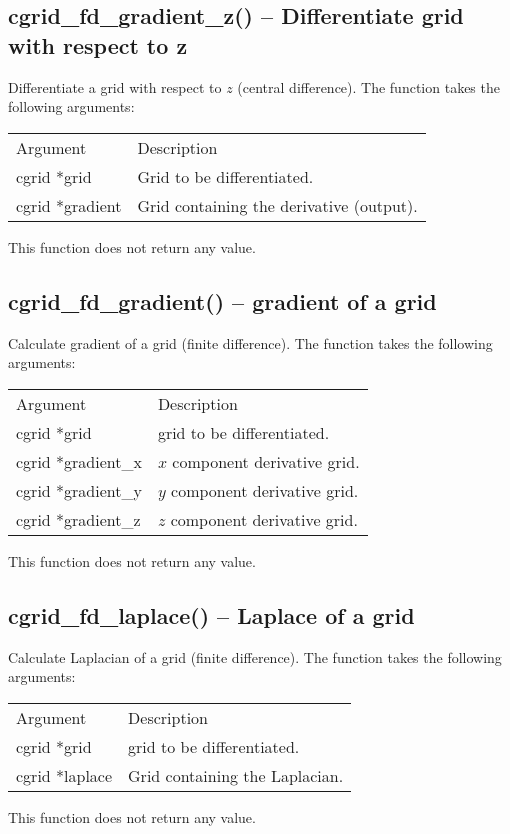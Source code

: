\documentclass[12pt,letterpaper]{report}
\begin{document}
\subsection{cgrid\_fd\_gradient\_z() -- Differentiate grid with respect to z}

Differentiate a grid with respect to $z$ (central difference). The function takes the following arguments:
\begin{longtable}{p{} p{}}
Argument & Description\\
\cline{1-2}
cgrid *grid & Grid to be differentiated.\\
cgrid *gradient & Grid containing the derivative (output).\\
\end{longtable}
\noindent
This function does not return any value.

\subsection{cgrid\_fd\_gradient() -- gradient of a grid}

Calculate gradient of a grid (finite difference). The function takes the following arguments:
\begin{longtable}{p{} p{}}
Argument & Description\\
\cline{1-2}
cgrid *grid & grid to be differentiated.\\
cgrid *gradient\_x & $x$ component derivative grid.\\
cgrid *gradient\_y & $y$ component derivative grid.\\
cgrid *gradient\_z & $z$ component derivative grid.\\
\end{longtable}
\noindent
This function does not return any value.

\subsection{cgrid\_fd\_laplace() -- Laplace of a grid}

Calculate Laplacian of a grid (finite difference). The function takes the following arguments:
\begin{longtable}{p{} p{}}
Argument & Description\\
\cline{1-2}
cgrid *grid & grid to be differentiated.\\
cgrid *laplace & Grid containing the Laplacian.\\
\end{longtable}
\noindent
This function does not return any value.
\end{document}

